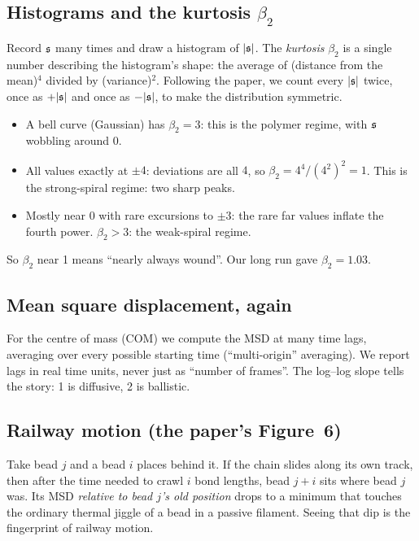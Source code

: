 \documentclass[11pt]{article}
\begin{document}
\subsection{Histograms and the kurtosis $\beta_2$}
Record $\mathfrak{s}$ many times and draw a histogram of $|\mathfrak{s}|$. The \emph{kurtosis} $\beta_2$ is a single number describing the histogram's shape: the average of (distance from the mean)$^4$
divided by (variance)$^2$. Following the paper, we count every $|\mathfrak{s}|$ twice, once as $+|\mathfrak{s}|$ and once as $-|\mathfrak{s}|$, to make the distribution symmetric.

\begin{notebox}[title=Worked examples of $\beta_2$]
\begin{itemize}
\item A bell curve (Gaussian) has $\beta_2=3$: this is the polymer regime, with $\mathfrak{s}$ wobbling around 0.
\item All values exactly at $\pm4$: deviations are all $4$, so $\beta_2=4^4/(4^2)^2=1$. This is the strong-spiral regime: two sharp peaks.
\item Mostly near 0 with rare excursions to $\pm3$: the rare far values inflate the fourth power. $\beta_2>3$: the weak-spiral regime.
\end{itemize}
So $\beta_2$ near 1 means ``nearly always wound''. Our long run gave $\beta_2=1.03$.
\end{notebox}

\subsection{Mean square displacement, again}
For the centre of mass (COM) we compute the MSD at many time lags, averaging over every possible starting time (``multi-origin'' averaging).
We report lags in real time units, never just as ``number of frames''. The log--log slope tells the story: 1 is diffusive, 2 is ballistic.

\subsection{Railway motion (the paper's Figure~6)}\label{sec:b-railway}
Take bead $j$ and a bead $i$ places behind it. If the chain slides along its own track, then after the time needed to crawl $i$ bond lengths, bead $j+i$ sits where bead $j$ was.
Its MSD \emph{relative to bead $j$'s old position} drops to a minimum that touches the ordinary thermal jiggle of a bead in a passive filament. Seeing that dip is the fingerprint of railway motion.
\end{document}
